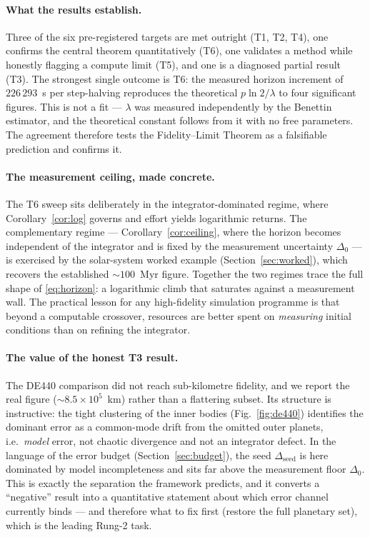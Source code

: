 \documentclass[11pt]{article}
\theoremstyle{definition}
\begin{document}
\paragraph{What the results establish.}
Three of the six pre-registered targets are met outright (T1, T2, T4), one
confirms the central theorem quantitatively (T6), one validates a method while
honestly flagging a compute limit (T5), and one is a diagnosed partial result
(T3). The strongest single outcome is T6: the measured horizon increment of
$226\,293$~s per step-halving reproduces the theoretical $p\ln2/\lambda$ to four
significant figures. This is not a fit --- $\lambda$ was measured independently
by the Benettin estimator, and the theoretical constant follows from it with no
free parameters. The agreement therefore tests the Fidelity--Limit Theorem as a
falsifiable prediction and confirms it.

\paragraph{The measurement ceiling, made concrete.}
The T6 sweep sits deliberately in the integrator-dominated regime, where
Corollary~\ref{cor:log} governs and effort yields logarithmic returns. The
complementary regime --- Corollary~\ref{cor:ceiling}, where the horizon becomes
independent of the integrator and is fixed by the measurement uncertainty
$\Delta_0$ --- is exercised by the solar-system worked example
(Section~\ref{sec:worked}), which recovers the established $\sim\!100$~Myr
figure. Together the two regimes trace the full shape of \eqref{eq:horizon}: a
logarithmic climb that saturates against a measurement wall. The practical
lesson for any high-fidelity simulation programme is that beyond a computable
crossover, resources are better spent on \emph{measuring} initial conditions
than on refining the integrator.

\paragraph{The value of the honest T3 result.}
The DE440 comparison did not reach sub-kilometre fidelity, and we report the
real figure ($\sim\!8.5\times10^{5}$~km) rather than a flattering subset. Its
structure is instructive: the tight clustering of the inner bodies
(Fig.~\ref{fig:de440}) identifies the dominant error as a common-mode drift from
the omitted outer planets, i.e.\ \emph{model} error, not chaotic divergence and
not an integrator defect. In the language of the error budget
(Section~\ref{sec:budget}), the seed $\Delta_{\mathrm{seed}}$ is here dominated
by model incompleteness and sits far above the measurement floor $\Delta_0$.
This is exactly the separation the framework predicts, and it converts a
``negative'' result into a quantitative statement about which error channel
currently binds --- and therefore what to fix first (restore the full planetary
set), which is the leading Rung-2 task.
\end{document}
